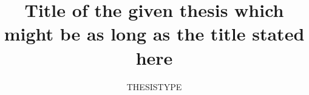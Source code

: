 \documentclass[
	bibliography=totoc,	%
	captions=tableheading,	%
	titlepage=firstiscover,	%
	twoside,		%
	headsepline=true,	%
	chapterprefix=true,	%
	numbers=noenddot,	%
	DIV=13,			%
	BCOR=12mm,		%
]{scrbook}
\title{Title of the given thesis which might be as long as the title stated here}
\date{THESISTYPE}
\begin{document}
\frontmatter
{}
\maketitle
\tableofcontents

\mainmatter






\newpage
\nocite{
	Lamport86,	%
}
\printbibliography

\newpage

\begin{appendix}
	
\end{appendix}



\end{document}
